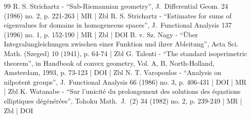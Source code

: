 \documentclass[10pt]{amsart}
\theoremstyle{definition}
\newcommand{\1}{\mathbbm{1}}
\begin{document}
\begin{thebibliography}{99}
R. S. Strichartz - “Sub-Riemannian geometry”, J. Differential Geom. 24 (1986) no. 2, p. 221-263 | MR | Zbl
R. S. Strichartz - “Estimates for sums of eigenvalues for domains in homogeneous spaces”, J. Functional Analysis 137 (1996) no. 1, p. 152-190 | MR | Zbl | DOI
B. v. Sz. Nagy - “Über Integralungleichungen zwischen einer Funktion und ihrer Ableitung”, Acta Sci. Math. (Szeged) 10 (1941), p. 64-74 | Zbl
G. Talenti - “The standard isoperimetric theorem”, in Handbook of convex geometry, Vol. A, B, North-Holland, Amsterdam, 1993, p. 73-123 | DOI | Zbl
N. T. Varopoulos - “Analysis on nilpotent groups”, J. Functional Analysis 66 (1986) no. 3, p. 406-431 | DOI | MR | Zbl
K. Watanabe - “Sur l’unicité du prolongement des solutions des équations elliptiques dégénérées”, Tohoku Math. J. (2) 34 (1982) no. 2, p. 239-249 | MR | Zbl | DOI
\end{thebibliography}
\end{document}
